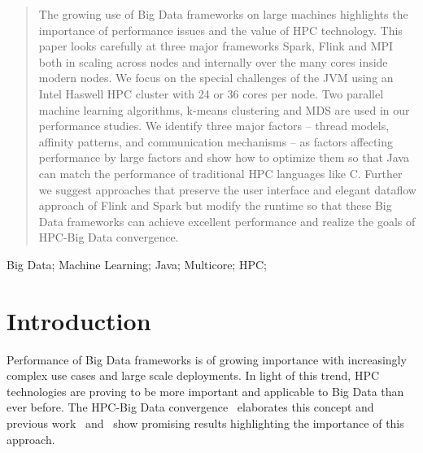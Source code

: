 \documentclass[10pt, conference, compsocconf]{IEEEtran}
\begin{document}
\begin{abstract}
The growing use of Big Data frameworks  on large machines highlights the importance of performance issues and the value of \ac{HPC} technology. This paper looks carefully at three major frameworks Spark, Flink and MPI both in scaling across nodes and internally over the many cores inside modern nodes. We focus on the special challenges of the \ac{JVM}  using an Intel   Haswell   \ac{HPC}   cluster   with   24   or  36   cores per  node. Two parallel machine  learning  algorithms,  k-means  clustering and  \ac{MDS} are used in our performance studies. We identify three major factors --  thread   models,   affinity   patterns,   and communication mechanisms -- as factors affecting performance by large factors and show how to optimize them so that Java can match the performance of traditional \ac{HPC} languages like C. Further we suggest approaches that preserve the user interface and elegant dataflow approach of Flink and Spark but modify the runtime so that these Big Data frameworks can achieve excellent performance and realize the goals of HPC-Big Data convergence.
\end{abstract}

\begin{IEEEkeywords}
Big Data; Machine Learning; Java; Multicore; HPC;
\end{IEEEkeywords}

\acresetall
%
\IEEEpeerreviewmaketitle



\section{Introduction} \label{sec:intro}

Performance of Big Data frameworks is of growing importance with increasingly complex use cases and large scale deployments. In light of this trend, \ac{HPC} technologies are proving to be more important and applicable to Big Data than ever before. The \ac{HPC}-Big Data convergence~\cite{fox1858big} elaborates this concept and previous work~\cite{hpc2016:spidaljava} and~\cite{kamburugamuve2016towards} show promising results highlighting the importance of this approach.
\end{document}
